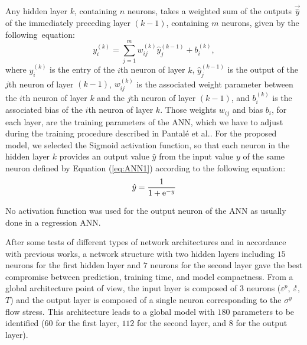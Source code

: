 \documentclass[metals,article,accept,pdftex,moreauthors]{Definitions/mdpi}
\makeatletter
\DeclareRobustCommand{\e}[1]{{\rm e}^{#1}}
\DeclareRobustCommand{\lay}[1]{^{(#1)}}
\DeclareRobustCommand{\mdot}[1]{\accentset{\mbox{\bfseries .}}{#1}}
\DeclareRobustCommand{\eal}{et al.\@\xspace}
\makeatother
\begin{document}
Any hidden layer $k$, containing $n$ neurons, takes a weighted sum of the outputs $\overrightarrow{\hat{y}}$ of the immediately preceding layer $(k-1)$, containing $m$ neurons, given by the following~equation:
\begin{equation}
y_i\lay{k} = \sum_{j=1}^m w_{ij}\lay{k} \hat{y}_j^{(k-1)}+ b_i\lay{k},\label{eq:ANN1}
\end{equation}
where $y_i\lay{k}$ is the entry of the  $i$th neuron of layer $k$, $\hat{y}_j\lay{k-1}$ is the output {of the} %
  $j$th neuron of layer $(k-1)$, $w_{ij}\lay{k}$ is the associated weight parameter between the  $i$th neuron of layer $k$ and the  $j$th neuron of layer $(k-1)$, and $b_i\lay{k}$ is the associated bias of the  $i$th neuron of layer $k$.
Those weights $w_{ij}$ and bias $b_i$, for each layer, are the training parameters of the ANN, which we have to adjust during the training procedure described in Pantalé \eal \cite{Pantale-2021, Pantale-2023}.
For the proposed model, we selected the Sigmoid activation function, so that each neuron in the hidden layer $k$ provides an output value ${\hat{y}}$ from the input value $y$ of the same neuron defined by Equation (\ref{eq:ANN1}) according to the following equation:
\begin{equation}
\hat{y}=\frac{1}{1 + \e{-y}}\label{eq:ANN2}
\end{equation}

No activation function was used for the output neuron of the ANN as usually done in a regression ANN.

After some tests of different types of network architectures and in accordance with previous works, a network structure with two hidden layers including $15$ neurons for the first hidden layer and $7$ neurons for the second layer gave the best compromise between prediction, training time, and model compactness.
From a global architecture point of view, the input layer is composed of $3$ neurons ($\varepsilon^p$, $\mdot\varepsilon$, $T$) and the output layer is composed of a single neuron corresponding to the $\sigma^y$ flow stress.
This architecture leads to a global model with $180$ parameters to be identified ($60$ for the first layer, $112$ for the second layer, and $8$ for the output layer).
\end{document}
